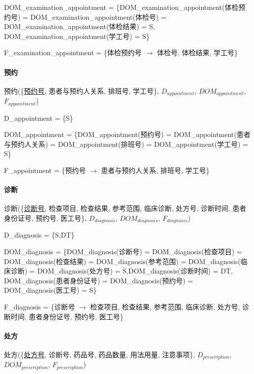 \documentclass{article}
\begin{document}
DOM\_examination\_appointment = \{DOM\_examination\_appointment(体检预约号) = \newline DOM\_examination\_appointment(体检号) = \newline DOM\_examination\_appointment(体检结果) = S, DOM\_examination\_appointment(学工号) = S\}

F\_examination\_appointment = \{体检预约号 $\rightarrow$ 体检号, 体检结果, 学工号\}

\paragraph{预约}

预约(\{\underline{预约号}, 患者与预约人关系, 排班号, 学工号\}, $D_{appointment}$, $DOM_{appointment}$, $F_{appointment}$)

D\_appointment = \{S\}

DOM\_appointment = \{DOM\_appointment(预约号) = DOM\_appointment(患者与预约人关系) = \newline DOM\_appointment(排班号) = DOM\_appointment(学工号) = S\}

F\_appointment = \{预约号 $\rightarrow$ 患者与预约人关系, 排班号, 学工号\}

\paragraph{诊断}

诊断(\{\underline{诊断号}, 检查项目, 检查结果, 参考范围, 临床诊断, 处方号, 诊断时间, 患者身份证号, 预约号, 医工号\}, $D_{diagnosis}$, $DOM_{diagnosis}$, $F_{diagnosis}$)

D\_diagnosis = \{S,DT\}

DOM\_diagnosis = \{DOM\_diagnosis(诊断号) = DOM\_diagnosis(检查项目) = DOM\_diagnosis(检查结果) = DOM\_diagnosis(参考范围) = DOM\_diagnosis(临床诊断) = DOM\_diagnosis(处方号) = S,\newline DOM\_diagnosis(诊断时间) = DT, DOM\_diagnosis(患者身份证号) = DOM\_diagnosis(预约号) = \newline DOM\_diagnosis(医工号) = S\}

F\_diagnosis = \{诊断号 $\rightarrow$ 检查项目, 检查结果, 参考范围, 临床诊断, 处方号, 诊断时间, 患者身份证号, 预约号, 医工号\}

\paragraph{处方}

处方(\{\underline{处方号}, 诊断号, 药品号, 药品数量, 用法用量, 注意事项\}, $D_{prescription}$, $DOM_{prescription}$, $F_{prescription}$)
\end{document}

